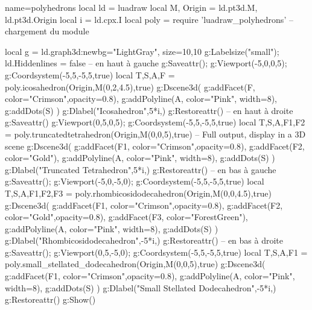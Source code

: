 \begin{luadraw}{name=polyhedrons}
local ld = luadraw
local M, Origin = ld.pt3d.M, ld.pt3d.Origin
local i = ld.cpx.I
local poly = require 'luadraw_polyhedrons' -- chargement du module

local g = ld.graph3d:new{bg="LightGray", size={10,10}}
g:Labelsize("small"); ld.Hiddenlines = false
-- en haut à gauche 
g:Saveattr(); g:Viewport(-5,0,0,5); g:Coordsystem(-5,5,-5,5,true)
local T,S,A,F = poly.icosahedron(Origin,M(0,2,4.5),true) 
g:Dscene3d(
    g:addFacet(F, {color="Crimson",opacity=0.8}),
    g:addPolyline(A, {color="Pink", width=8}),
    g:addDots(S) )
g:Dlabel("Icosahedron",5*i,{})
g:Restoreattr()
-- en haut à droite
g:Saveattr()
g:Viewport(0,5,0,5); g:Coordsystem(-5,5,-5,5,true)
local T,S,A,F1,F2 = poly.truncatedtetrahedron(Origin,M(0,0,5),true) -- Full output, display in a 3D scene
g:Dscene3d(
    g:addFacet(F1, {color="Crimson",opacity=0.8}),
    g:addFacet(F2, {color="Gold"}),
    g:addPolyline(A, {color="Pink", width=8}),
    g:addDots(S) )
g:Dlabel("Truncated Tetrahedron",5*i,{})
g:Restoreattr()
-- en bas à gauche
g:Saveattr(); g:Viewport(-5,0,-5,0); g:Coordsystem(-5,5,-5,5,true)
local T,S,A,F1,F2,F3 = poly.rhombicosidodecahedron(Origin,M(0,0,4.5),true)
g:Dscene3d(
    g:addFacet(F1, {color="Crimson",opacity=0.8}),
    g:addFacet(F2, {color="Gold",opacity=0.8}), g:addFacet(F3, {color="ForestGreen"}),
    g:addPolyline(A, {color="Pink", width=8}), g:addDots(S) )
g:Dlabel("Rhombicosidodecahedron",-5*i,{})
g:Restoreattr()
-- en bas à droite
g:Saveattr(); g:Viewport(0,5,-5,0); g:Coordsystem(-5,5,-5,5,true)
local T,S,A,F1 = poly.small_stellated_dodecahedron(Origin,M(0,0,5),true)
g:Dscene3d(
    g:addFacet(F1, {color="Crimson",opacity=0.8}),
    g:addPolyline(A, {color="Pink", width=8}),
    g:addDots(S) )
g:Dlabel("Small Stellated Dodecahedron",-5*i,{})
g:Restoreattr()
g:Show()
\end{luadraw}
